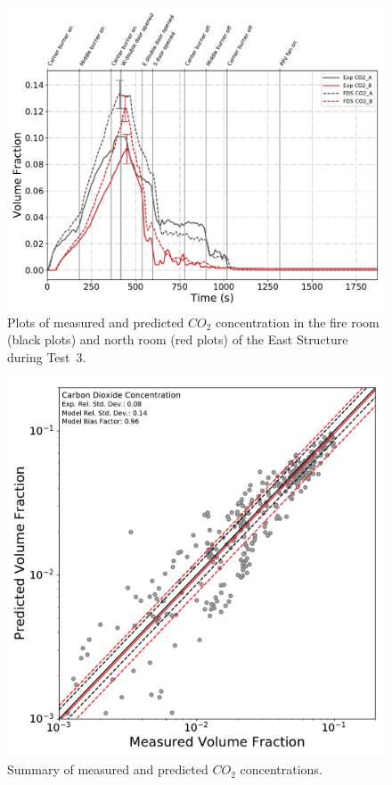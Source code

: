 \begin{figure}[!h]
	\centering
	\includegraphics[width=\columnwidth]{Figures/Plots/Validation/Gas_Concentration/Test_3_CO2}
	\caption[Plots of measured and predicted $CO_2$ concentration during Test~3.]{Plots of measured and predicted $CO_2$ concentration in the fire room (black plots) and north room (red plots) of the East Structure during Test~3.}
	\label{fig:Test3_CO2}
\end{figure}

\begin{figure}[!h]
	\centering
	\includegraphics[width=\columnwidth]{Figures/Plots/Validation/Gas_Concentration/loglog_CO2}
	\caption{Summary of measured and predicted $CO_2$ concentrations.}
	\label{fig:loglog_CO2}
\end{figure}

